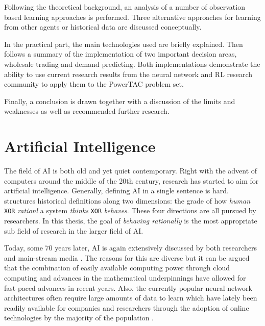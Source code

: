 Following the theoretical background, an analysis of a number of observation based learning approaches is performed.
Three alternative approaches for learning from other agents or historical data are discussed conceptually.

In the practical part, the main technologies used are briefly explained. Then follows a summary of the implementation
of two important decision areas, wholesale trading and demand predicting. Both implementations demonstrate
the ability to use current research results from the neural network and \ac{RL} research community to apply them to the
\ac{PowerTAC} problem set.

Finally, a conclusion is drawn together with a discussion of the limits and weaknesses as well as recommended further research.



\section{Artificial Intelligence}%
\label{sec:artificial_intelligence}


The field of \ac{AI} is both old and yet quiet contemporary.
Right with the advent of computers around the middle of the 20th century, research has started to aim for artificial
intelligence. Generally, defining \ac{AI} in a single sentence is hard. \citet{russell2016artificial} structures
historical definitions along two dimensions: the grade of how \emph{human} \texttt{XOR} \emph{rationl} a system
\emph{thinks} \texttt{XOR} \emph{behaves}. These four directions are all pursued by researchers. In
this thesis, the goal of \emph{behaving rationally} is the most appropriate sub field of research in the larger field of
\ac{AI}.

Today, some 70 years later, \ac{AI} is again extensively discussed by both researchers and main-stream media
\citep[p.24ff.]{russell2016artificial, arulkumaran2017brief}. The reasons for this are diverse but it can be argued that
the combination of easily available computing power through cloud computing and advances in the mathematical
underpinnings have allowed for fast-paced advances in recent years. Also, the currently popular neural network
architectures often require large amounts of data to learn which have lately been readily available for companies and
researchers through the adoption of online technologies by the majority of the population
\citep[p.27]{russell2016artificial}.

